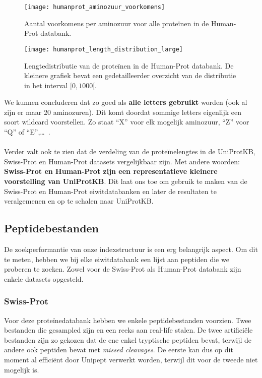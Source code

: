\begin{figure}[ht]
    \centering
    \texttt{[image: humanprot\_aminozuur\_voorkomens]}
    \caption{Aantal voorkomens per aminozuur voor alle proteïnen in de Human-Prot databank.}
    \label{fig:humanprot_aminozuur}
\end{figure}

\begin{figure}[ht]
    \centering
    \texttt{[image: humanprot\_length\_distribution\_large]}
    \caption{Lengtedistributie van de proteïnen in de Human-Prot databank. De kleinere grafiek bevat een gedetailleerder overzicht van de distributie in het interval $[0, 1000[$.}\label{fig:humanprot_length}
\end{figure}

We kunnen concluderen dat zo goed als \textbf{alle letters gebruikt} worden (ook al zijn er maar 20 aminozuren).
Dit komt doordat sommige letters eigenlijk een soort wildcard voorstellen.
Zo staat ``X'' voor elk mogelijk aminozuur, ``Z'' voor ``Q'' of ``E'',\ldots~\cite{amino_acid_codes}.
\\ \\
Verder valt ook te zien dat de verdeling van de proteïnelengtes in de UniProtKB, Swiss-Prot en Human-Prot datasets vergelijkbaar zijn.
Met andere woorden: \textbf{Swiss-Prot en Human-Prot zijn een representatieve kleinere voorstelling van UniProtKB\@}.
Dit laat ons toe om gebruik te maken van de Swiss-Prot en Human-Prot eiwitdatabanken en later de resultaten te veralgemenen en op te schalen naar UniProtKB\@.

\subsection{Peptidebestanden}\label{subsec:peptide-zoek-bestanden}
De zoekperformantie van onze indexstructuur is een erg belangrijk aspect.
Om dit te meten, hebben we bij elke eiwitdatabank een lijst aan peptiden die we proberen te zoeken.
Zowel voor de Swiss-Prot als Human-Prot databank zijn enkele datasets opgesteld.

\subsubsection{Swiss-Prot}
Voor deze proteïnedatabank hebben we enkele peptidebestanden voorzien.
Twee bestanden die gesampled zijn en een reeks aan real-life stalen.
De twee artificiële bestanden zijn zo gekozen dat de ene enkel tryptische peptiden bevat, terwijl de andere ook peptiden bevat met \textit{missed cleavages}.
De eerste kan dus op dit moment al efficiënt door Unipept verwerkt worden, terwijl dit voor de tweede niet mogelijk is.

